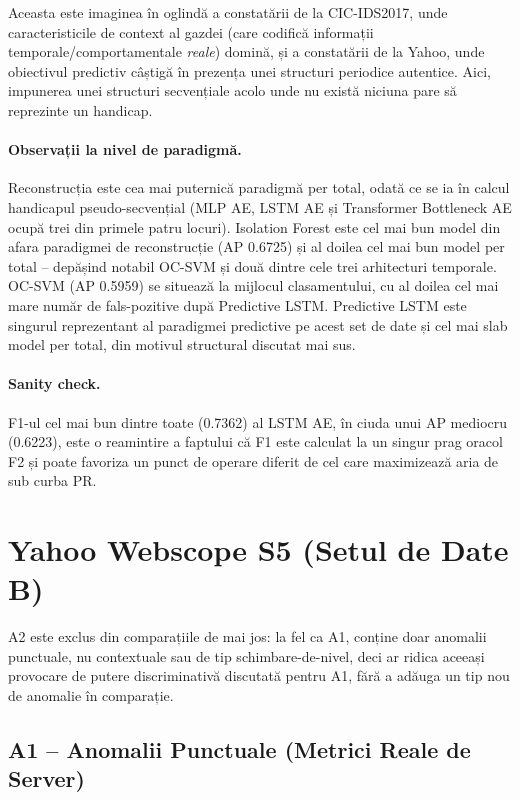 Aceasta este imaginea în oglindă a constatării de la CIC-IDS2017, unde caracteristicile de context al gazdei (care codifică informații temporale/comportamentale \emph{reale}) domină, și a constatării de la Yahoo, unde obiectivul predictiv câștigă în prezența unei structuri periodice autentice. 
Aici, impunerea unei structuri secvențiale acolo unde nu există niciuna pare să reprezinte un handicap.

\paragraph{Observații la nivel de paradigmă.} Reconstrucția este cea mai puternică paradigmă per total, odată ce se ia în calcul handicapul pseudo-secvențial (MLP AE, LSTM AE și Transformer Bottleneck AE ocupă trei din primele patru locuri). 
Isolation Forest este cel mai bun model din afara paradigmei de reconstrucție (AP 0.6725) și al doilea cel mai bun model per total -- depășind notabil OC-SVM și două dintre cele trei arhitecturi temporale. OC-SVM (AP 0.5959) se situează la mijlocul clasamentului, cu al doilea cel mai mare număr de fals-pozitive după Predictive LSTM. Predictive LSTM este singurul reprezentant al paradigmei predictive pe acest set de date și cel mai slab model per total, din motivul structural discutat mai sus. 

\paragraph{Sanity check.} F1-ul cel mai bun dintre toate (0.7362) al LSTM AE, în ciuda unui AP mediocru (0.6223), este o reamintire a faptului că F1 este calculat la un singur prag oracol F2 și poate favoriza un punct de operare diferit de cel care maximizează aria de sub curba PR.



\section{Yahoo Webscope S5 (Setul de Date B)}

A2 este exclus din comparațiile de mai jos: la fel ca A1, conține doar anomalii punctuale, nu contextuale sau de tip schimbare-de-nivel, deci ar ridica aceeași provocare de putere discriminativă discutată pentru A1, fără a adăuga un tip nou de anomalie în comparație.

\subsection{A1 -- Anomalii Punctuale (Metrici Reale de Server)}


